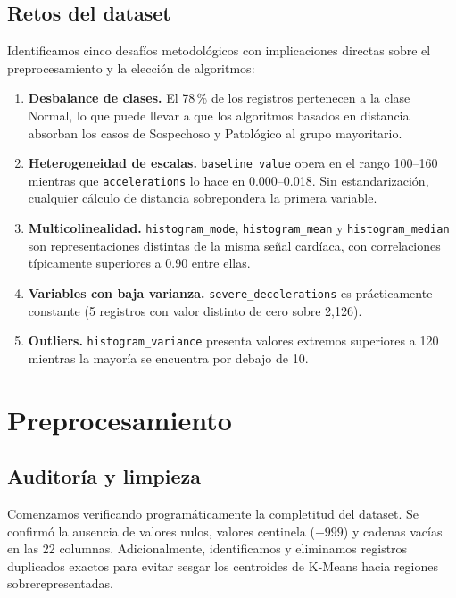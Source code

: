 \documentclass[12pt,letterpaper]{article}
\begin{document}
\subsection{Retos del dataset}

Identificamos cinco desafíos metodológicos con implicaciones directas sobre el preprocesamiento
y la elección de algoritmos:

\begin{enumerate}[label=\Alph*.]
  \item \textbf{Desbalance de clases.} El 78\,\% de los registros pertenecen a la clase Normal,
  lo que puede llevar a que los algoritmos basados en distancia absorban los casos de
  Sospechoso y Patológico al grupo mayoritario.
  \item \textbf{Heterogeneidad de escalas.} \texttt{baseline\_value} opera en el rango
  100--160 mientras que \texttt{accelerations} lo hace en 0.000--0.018. Sin estandarización,
  cualquier cálculo de distancia sobrepondera la primera variable.
  \item \textbf{Multicolinealidad.} \texttt{histogram\_mode}, \texttt{histogram\_mean} y
  \texttt{histogram\_median} son representaciones distintas de la misma señal cardíaca,
  con correlaciones típicamente superiores a 0.90 entre ellas.
  \item \textbf{Variables con baja varianza.} \texttt{severe\_decelerations} es prácticamente
  constante (5 registros con valor distinto de cero sobre 2{,}126).
  \item \textbf{Outliers.} \texttt{histogram\_variance} presenta valores extremos superiores
  a 120 mientras la mayoría se encuentra por debajo de 10.
\end{enumerate}

\newpage

\section{Preprocesamiento}

\subsection{Auditoría y limpieza}

Comenzamos verificando programáticamente la completitud del dataset. Se confirmó la ausencia
de valores nulos, valores centinela ($-999$) y cadenas vacías en las 22 columnas. Adicionalmente,
identificamos y eliminamos registros duplicados exactos para evitar sesgar los centroides de
K-Means hacia regiones sobrerepresentadas.
\end{document}

